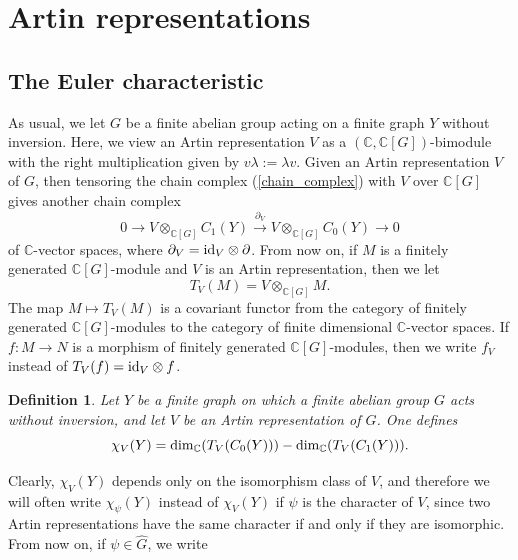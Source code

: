 \documentclass[11pt]{amsart}
\newtheorem{definition}[theorem]{Definition}
\numberwithin{equation}{section}
\theoremstyle{remark}
\theoremstyle{definition}
\begin{document}
\section{Artin representations} \label{section:art}
\subsection{The Euler characteristic} \label{section:Eul}
As usual, we let $G$ be a finite abelian group acting on a finite graph $Y$ without inversion.  Here, we view an Artin representation $V$ as a $(\mathbb{C},\mathbb{C}[G])$-bimodule with the right multiplication given by $v\lambda := \lambda v$.  Given an Artin representation $V$ of $G$, then tensoring the chain complex (\ref{chain_complex}) with $V$ over $\mathbb{C}[G]$ gives another chain complex
$$0 \longrightarrow V \otimes_{\mathbb{C}[G]}C_{1}(Y) \stackrel{\partial_{V}}{\longrightarrow} V \otimes_{\mathbb{C}[G]}C_{0}(Y) \longrightarrow 0$$
of $\mathbb{C}$-vector spaces, where $\partial_{V} = {\rm id}_{V} \otimes \partial$.  From now on, if $M$ is a finitely generated $\mathbb{C}[G]$-module and $V$ is an Artin representation, then we let
$$T_{V}(M) = V \otimes_{\mathbb{C}[G]}M. $$
The map $M \mapsto T_{V}(M)$ is a covariant functor from the category of finitely generated $\mathbb{C}[G]$-modules to the category of finite dimensional $\mathbb{C}$-vector spaces.  If $f:M \rightarrow N$ is a morphism of finitely generated $\mathbb{C}[G]$-modules, then we write $f_{V}$ instead of $T_{V}(f) = {\rm id}_{V} \otimes f$.
\begin{definition} \label{artin_euler}
Let $Y$ be a finite graph on which a finite abelian group $G$ acts without inversion, and let $V$ be an Artin representation of $G$.  One defines
$$\chi_{V}(Y) = {\rm dim}_{\mathbb{C}}(T_{V}(C_{0}(Y))) - {\rm dim}_{\mathbb{C}} (T_{V}(C_{1}(Y))). $$
\end{definition}
Clearly, $\chi_{V}(Y)$ depends only on the isomorphism class of $V$, and therefore we will often write $\chi_{\psi}(Y)$ instead of $\chi_{V}(Y)$ if $\psi$ is the character of $V$, since two Artin representations have the same character if and only if they are isomorphic.  From now on, if $\psi \in \widehat{G}$, we write 
\end{document}
